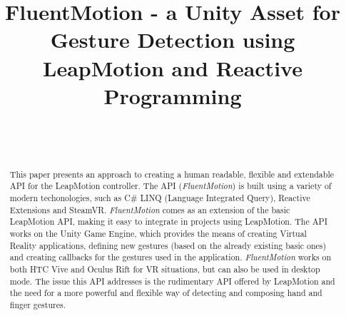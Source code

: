 \documentclass{sigchi}
\def\fluentmotion{\textit{FluentMotion}}
\def\rx{Reactive Extensions}
\def\unity{Unity Game Engine}
\def\leap{LeapMotion}
\def\vr{Virtual Reality}
\def\steamvr{SteamVR}
\def\vive{HTC Vive}
\def\oculus{Oculus Rift}
\begin{document}

\title{FluentMotion - a Unity Asset for Gesture Detection using LeapMotion and Reactive Programming}

\author{
  \\
  \\
}

\maketitle

\begin{abstract}
  This paper presents an approach to creating a human readable, flexible and extendable API for the \leap{} controller. The API (\fluentmotion{}) is built using a variety of modern techonologies, such as C\# LINQ (Language Integrated Query), \rx{} \cite{rx} and \steamvr{}. \fluentmotion{} comes as an extension of the basic \leap{} API, making it easy to integrate in projects using \leap{}. The API works on the \unity{}, which provides the means of creating \vr{} applications, defining new gestures (based on the already existing basic ones) and creating callbacks for the gestures used in the application. \fluentmotion{} works on both \vive{} and \oculus{} for VR situations, but can also be used in desktop mode. The issue this API addresses is the rudimentary API offered by \leap{} and the need for a more powerful and flexible way of detecting and composing hand and finger gestures.
\end{abstract}


\end{document}
